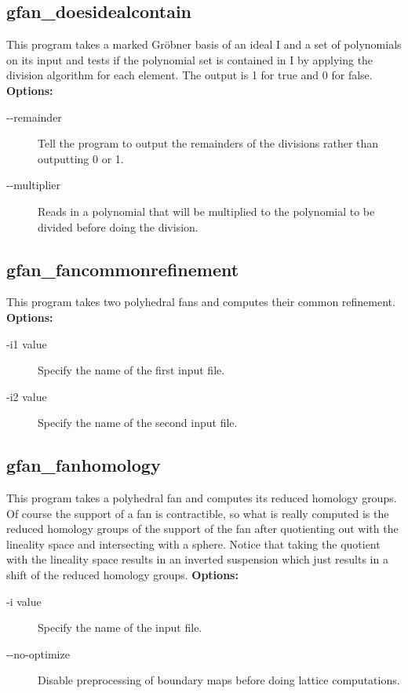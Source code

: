 {{{{\subsection{gfan\_doesidealcontain}\label{applist:_doesidealcontain}
This program takes a marked Gr\"obner basis of an ideal I and a set of polynomials on its input and tests if the polynomial set is contained in I by applying the division algorithm for each element. The output is 1 for true and 0 for false.
\newline
{\bf Options:}
\begin{description}
\item[-\hspace{0.013cm}-remainder]Tell the program to output the remainders of the divisions rather than outputting 0 or 1.\item[-\hspace{0.013cm}-multiplier]Reads in a polynomial that will be multiplied to the polynomial to be divided before doing the division.\end{description}


{\subsection{gfan\_fancommonrefinement}\label{applist:_fancommonrefinement}
This program takes two polyhedral fans and computes their common refinement.
\newline
{\bf Options:}
\begin{description}
\item[-i1 value]Specify the name of the first input file.\item[-i2 value]Specify the name of the second input file.\end{description}


{\subsection{gfan\_fanhomology}\label{applist:_fanhomology}
This program takes a polyhedral fan and computes its reduced homology groups. Of course the support of a fan is contractible, so what is really computed is the reduced homology groups of the support of the fan after quotienting out with the lineality space and intersecting with a sphere. Notice that taking the quotient with the lineality space results in an inverted suspension which just results in a shift of the reduced homology groups.
\newline
{\bf Options:}
\begin{description}
\item[-i value]Specify the name of the input file.\item[-\hspace{0.013cm}-no-optimize]Disable preprocessing of boundary maps before doing lattice computations.\end{description}


}}}}}}
